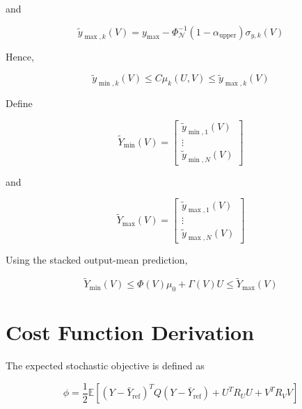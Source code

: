 and

\begin{equation}
    \boxed{
    \tilde{y}_{\max,k}(V)
    =
    y_{\max}
    -
    \Phi_{\mathcal{N}}^{-1}
    (1-\alpha_{\mathrm{upper}})
    \sigma_{y,k}(V)
    }
\end{equation}

Hence,

\begin{equation}
    \boxed{
    \tilde{y}_{\min,k}(V)
    \leq
    C\mu_k(U,V)
    \leq
    \tilde{y}_{\max,k}(V)
    }
\end{equation}

Define

\begin{equation}
    \tilde{Y}_{\min}(V)
    =
    \begin{bmatrix}
        \tilde{y}_{\min,1}(V)\\
        \vdots\\
        \tilde{y}_{\min,N}(V)
    \end{bmatrix}
\end{equation}

and

\begin{equation}
    \tilde{Y}_{\max}(V)
    =
    \begin{bmatrix}
        \tilde{y}_{\max,1}(V)\\
        \vdots\\
        \tilde{y}_{\max,N}(V)
    \end{bmatrix}
\end{equation}

Using the stacked output-mean prediction,

\begin{equation}
    \boxed{
    \tilde{Y}_{\min}(V)
    \leq
    \Phi(V)\mu_0+\Gamma(V)U
    \leq
    \tilde{Y}_{\max}(V)
    }
    \label{eq:sb_stacked_chance}
\end{equation}

\section{Cost Function Derivation}
\label{sec:sb_cost}

The expected stochastic objective is defined as

\begin{equation}
    \phi
    =
    \frac{1}{2}
    \mathbb{E}
    \left[
        (Y-\bar{Y}_{\mathrm{ref}})^T
        Q
        (Y-\bar{Y}_{\mathrm{ref}})
        +
        U^TR_UU
        +
        V^TR_VV
    \right]
\end{equation}

